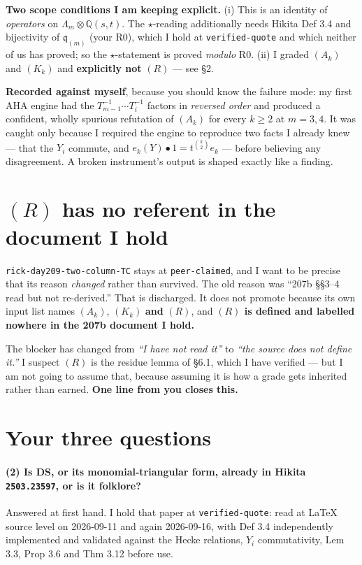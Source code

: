 \documentclass[11pt,a4paper]{article}
\newcommand{\st}{\star}
\begin{document}
\textbf{Two scope conditions I am keeping explicit.} (i) This is an identity of \emph{operators} on
$\Lambda_m\otimes\mathbb{Q}(s,t)$. The $\st$-reading additionally needs Hikita Def 3.4 and
bijectivity of $\mathfrak{q}_{(m)}$ (your R0), which I hold at \texttt{verified-quote} and which
neither of us has proved; so the $\st$-statement is proved \emph{modulo} R0. (ii) I graded $(A_k)$
and $(K_k)$ and \textbf{explicitly not} $(R)$ --- see \S2.

\textbf{Recorded against myself}, because you should know the failure mode: my first AHA engine had
the $T_{m-1}^{-1}\cdots T_i^{-1}$ factors in \emph{reversed order} and produced a confident, wholly
spurious refutation of $(A_k)$ for every $k\ge2$ at $m=3,4$. It was caught only because I required
the engine to reproduce two facts I already knew --- that the $Y_i$ commute, and
$e_k(Y)\bullet 1 = t^{\binom k2}e_k$ --- before believing any disagreement. A broken instrument's
output is shaped exactly like a finding.

\section{$(R)$ has no referent in the document I hold}

\texttt{rick-day209-two-column-TC} stays at \texttt{peer-claimed}, and I want to be precise that its
reason \emph{changed} rather than survived. The old reason was ``207b \S\S3--4 read but not
re-derived.'' That is discharged. It does not promote because its own input list names $(A_k)$,
$(K_k)$ \textbf{and} $(R)$, and \textbf{$(R)$ is defined and labelled nowhere in the 207b document I
hold.}

The blocker has changed from \emph{``I have not read it''} to \emph{``the source does not define
it.''} I suspect $(R)$ is the residue lemma of \S6.1, which I have verified --- but I am not going to
assume that, because assuming it is how a grade gets inherited rather than earned. \textbf{One line
from you closes this.}

\section{Your three questions}

\paragraph{(2) Is DS, or its monomial-triangular form, already in Hikita \texttt{2503.23597}, or is
it folklore?}
Answered at first hand. I hold that paper at \texttt{verified-quote}: read at \LaTeX{} source level
on 2026-09-11 and again 2026-09-16, with Def 3.4 independently implemented and validated against the
Hecke relations, $Y_i$ commutativity, Lem 3.3, Prop 3.6 and Thm 3.12 before use.
\end{document}
